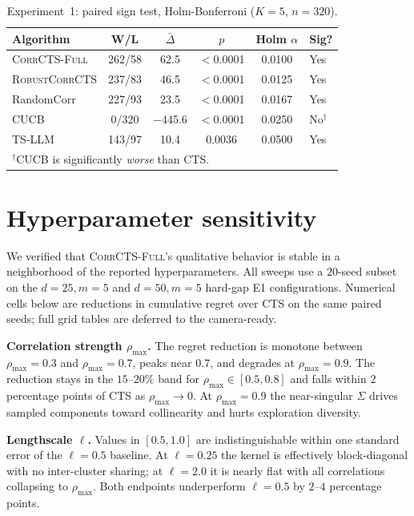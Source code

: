 \documentclass{article}
\theoremstyle{plain}
\theoremstyle{definition}
\theoremstyle{remark}
\newcommand{\CorrFull}{\textsc{CorrCTS-Full}}
\newcommand{\RobustCorr}{\textsc{RobustCorrCTS}}
\begin{document}
\begin{table}[h]
\caption{Experiment~1: paired sign test, Holm-Bonferroni ($K = 5$, $n = 320$).}
\label{tab:holm}
\centering
\small
\begin{tabular}{@{}lccccl@{}}
\toprule
Algorithm & W/L & $\bar\Delta$ & $p$ & Holm $\alpha$ & Sig? \\
\midrule
\CorrFull{} & 262/58 & 62.5 & ${<}$0.0001 & 0.0100 & Yes \\
\RobustCorr{} & 237/83 & 46.5 & ${<}$0.0001 & 0.0125 & Yes \\
RandomCorr & 227/93 & 23.5 & ${<}$0.0001 & 0.0167 & Yes \\
CUCB & 0/320 & $-$445.6 & ${<}$0.0001 & 0.0250 & No$^\dagger$ \\
TS-LLM & 143/97 & 10.4 & 0.0036 & 0.0500 & Yes \\
\bottomrule
\multicolumn{6}{l}{\footnotesize $^\dagger$CUCB is significantly \emph{worse} than CTS.}
\end{tabular}
\end{table}

\section{Hyperparameter sensitivity}\label{app:sensitivity}

We verified that \CorrFull{}'s qualitative behavior is stable in a neighborhood of the reported hyperparameters.
All sweeps use a $20$-seed subset on the $d = 25, m = 5$ and $d = 50, m = 5$ hard-gap E1 configurations.
Numerical cells below are reductions in cumulative regret over CTS on the same paired seeds; full grid tables are deferred to the camera-ready.

\textbf{Correlation strength $\rho_{\max}$.}
The regret reduction is monotone between $\rho_{\max} = 0.3$ and $\rho_{\max} = 0.7$, peaks near $0.7$, and degrades at $\rho_{\max} = 0.9$.
The reduction stays in the $15$--$20\%$ band for $\rho_{\max} \in [0.5, 0.8]$ and falls within $2$ percentage points of CTS as $\rho_{\max} \to 0$.
At $\rho_{\max} = 0.9$ the near-singular $\Sigma$ drives sampled components toward collinearity and hurts exploration diversity.

\textbf{Lengthscale $\ell$.}
Values in $[0.5, 1.0]$ are indistinguishable within one standard error of the $\ell = 0.5$ baseline.
At $\ell = 0.25$ the kernel is effectively block-diagonal with no inter-cluster sharing; at $\ell = 2.0$ it is nearly flat with all correlations collapsing to $\rho_{\max}$.
Both endpoints underperform $\ell = 0.5$ by $2$--$4$ percentage points.
\end{document}
